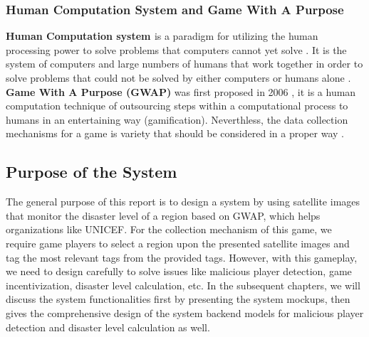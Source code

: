 \subsubsection{Human Computation System and Game With A Purpose}


\textbf{Human Computation system \label{idx:hc}} is a paradigm for utilizing the human processing power to solve problems 
that computers cannot yet solve \cite{quinn2011human}.
It is the system of computers and large numbers of humans that work together in order to solve problems 
that could not be solved by either computers or humans alone \cite{quinn2009taxonomy}.
\textbf{Game With A Purpose (GWAP)\label{idx:gwap}} was first proposed in 2006 \cite{von2006games}, it
is a human computation technique of outsourcing steps 
within a computational process to humans in an entertaining way (gamification). 
Neverthless, the data collection mechanisms for a game is variety that should be considered in a proper way \cite{von2008designing}.

\subsection{Purpose of the System}

The general purpose of this report is to design a system by using satellite images
that monitor the disaster level of a region based on GWAP,
which helps organizations like UNICEF. For the collection mechanism of this game, 
we require game players to select a region upon
the presented satellite images and tag the most relevant tags from the provided tags.
However, with this gameplay, we need to design carefully to solve issues like malicious player detection,
game incentivization, disaster level calculation, etc.
In the subsequent chapters, we will discuss the system functionalities first by presenting the system mockups, 
then gives the comprehensive design of the system backend models for malicious player detection
and disaster level calculation as well. 

